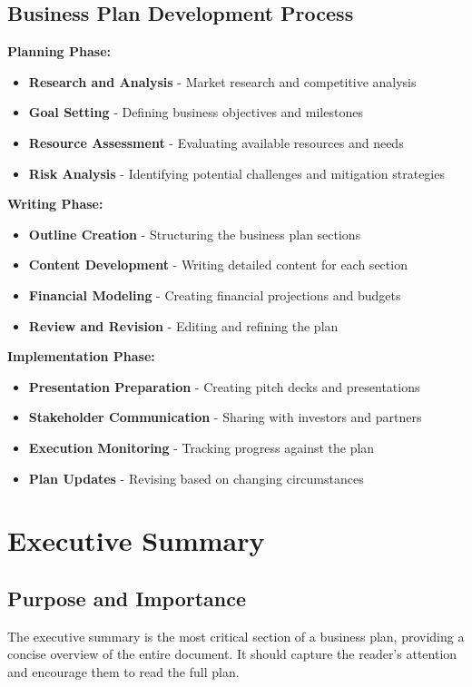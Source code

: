 \documentclass[12pt]{article}
\begin{document}
\subsection{Business Plan Development Process}

\textbf{Planning Phase:}
\begin{itemize}
    \item \textbf{Research and Analysis} - Market research and competitive analysis
    \item \textbf{Goal Setting} - Defining business objectives and milestones
    \item \textbf{Resource Assessment} - Evaluating available resources and needs
    \item \textbf{Risk Analysis} - Identifying potential challenges and mitigation strategies
\end{itemize}

\textbf{Writing Phase:}
\begin{itemize}
    \item \textbf{Outline Creation} - Structuring the business plan sections
    \item \textbf{Content Development} - Writing detailed content for each section
    \item \textbf{Financial Modeling} - Creating financial projections and budgets
    \item \textbf{Review and Revision} - Editing and refining the plan
\end{itemize}

\textbf{Implementation Phase:}
\begin{itemize}
    \item \textbf{Presentation Preparation} - Creating pitch decks and presentations
    \item \textbf{Stakeholder Communication} - Sharing with investors and partners
    \item \textbf{Execution Monitoring} - Tracking progress against the plan
    \item \textbf{Plan Updates} - Revising based on changing circumstances
\end{itemize}

\section{Executive Summary}

\subsection{Purpose and Importance}
The executive summary is the most critical section of a business plan, providing a concise overview of the entire document. It should capture the reader's attention and encourage them to read the full plan.
\end{document}
